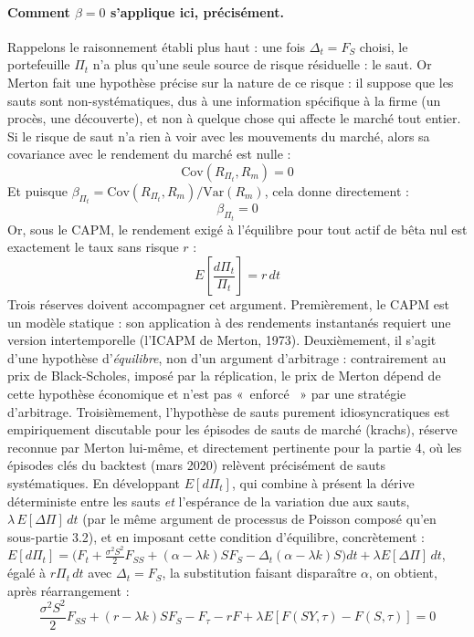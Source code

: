 \documentclass{article}
\providecommand{\og}{«~}
\providecommand{\fg}{~»}
\begin{document}
\paragraph{Comment $\beta=0$ s'applique ici, précisément.} Rappelons le raisonnement établi plus haut : une fois $\Delta_t = F_S$ choisi, le portefeuille $\Pi_t$ n'a plus qu'une seule source de risque résiduelle : le saut. Or Merton fait une hypothèse précise sur la nature de ce risque : il suppose que les sauts sont non-systématiques, dus à une information spécifique à la firme (un procès, une découverte), et non à quelque chose qui affecte le marché tout entier.
Si le risque de saut n'a rien à voir avec les mouvements du marché, alors sa covariance avec le rendement du marché est nulle :
\begin{equation}
\text{Cov}(R_{\Pi_t}, R_m) = 0
\end{equation}
Et puisque $\beta_{\Pi_t} = \text{Cov}(R_{\Pi_t},R_m)/\text{Var}(R_m)$, cela donne directement :
\begin{equation}
\beta_{\Pi_t} = 0
\end{equation}
Or, sous le CAPM, le rendement exigé à l'équilibre pour tout actif de bêta nul est exactement le taux sans risque $r$ :
\begin{equation}
E\left[\frac{d\Pi_t}{\Pi_t}\right] = r\, dt
\end{equation}
Trois réserves doivent accompagner cet argument. Premièrement, le CAPM est un modèle statique : son application à des rendements instantanés requiert une version intertemporelle (l'ICAPM de Merton, 1973). Deuxièmement, il s'agit d'une hypothèse d'\emph{équilibre}, non d'un argument d'arbitrage : contrairement au prix de Black-Scholes, imposé par la réplication, le prix de Merton dépend de cette hypothèse économique et n'est pas \og enforcé \fg{} par une stratégie d'arbitrage. Troisièmement, l'hypothèse de sauts purement idiosyncratiques est empiriquement discutable pour les épisodes de sauts de marché (krachs), réserve reconnue par Merton lui-même, et directement pertinente pour la partie 4, où les épisodes clés du backtest (mars 2020) relèvent précisément de sauts systématiques.
En développant $E[d\Pi_t]$, qui combine à présent la dérive déterministe entre les sauts \emph{et} l'espérance de la variation due aux sauts, $\lambda\, E[\Delta\Pi]\, dt$ (par le même argument de processus de Poisson composé qu'en sous-partie 3.2), et en imposant cette condition d'équilibre, concrètement : $E[d\Pi_t] = \big(F_t + \frac{\sigma^2S^2}{2}F_{SS} + (\alpha-\lambda k)S F_S - \Delta_t(\alpha-\lambda k)S\big)dt + \lambda E[\Delta\Pi]\,dt$, égalé à $r\Pi_t\,dt$ avec $\Delta_t=F_S$, la substitution faisant disparaître $\alpha$, on obtient, après réarrangement :
\begin{equation}
\frac{\sigma^2 S^2}{2} F_{SS} + (r-\lambda k) S F_S - F_\tau - rF + \lambda E\left[F(SY,\tau) - F(S,\tau)\right] = 0
\label{eq:merton_pde}
\end{equation}
\end{document}
